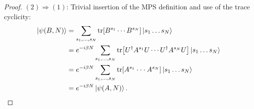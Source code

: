 \begin{proof}
\noindent $(2) \Rightarrow (1)$: Trivial insertion of the MPS definition and use of the trace cyclicity:
\begin{align}
\begin{split}
	\ket{\psi(B,N)} &= \sum_{s_1,...,s_N} \tr[B^{s_1} \cdots B^{s_N}]\ket{s_1 \ldots s_N} \\
	&= e^{-i\beta N} \sum_{s_1, \ldots, s_N} \tr[U^{\dagger} A^{s_1} U \cdots U^{\dagger} A^{s_N} U]\ket{s_1 \ldots s_N} \\
	&= e^{-i\beta N}\sum_{s_1,...,s_N} \tr[A^{s_1} \cdot\cdot\cdot A^{s_N}]\ket{s_1 \ldots s_N} \\
	&= e^{-i \beta N} \ket{\psi(A,N)}.
\end{split}
\end{align}


\end{proof}
